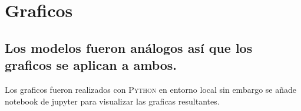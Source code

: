 \section{Graficos}
\subsection*{Los modelos fueron análogos así que los graficos se aplican a ambos.}

Los graficos fueron realizados con \textsc{Python} en entorno local sin embargo se añade notebook de jupyter para visualizar las graficas resultantes. 



